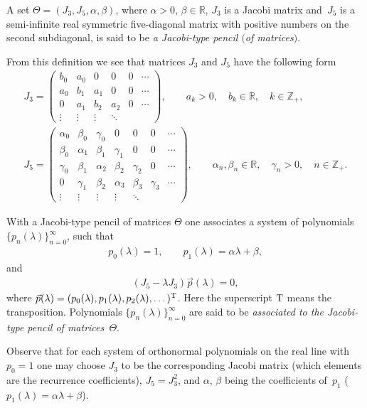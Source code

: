 \begin{Definition}\label{d1_1}A set $\Theta = (J_3, J_5, \alpha, \beta)$, where $\alpha>0$, $\beta\in\mathbb{R}$, $J_3$ is a Jacobi matrix and~$J_5$ is a semi-inf\/inite real symmetric f\/ive-diagonal matrix with positive numbers on the second subdiagonal, is said to be \textit{a Jacobi-type pencil $($of matrices$)$}.
\end{Definition}
From this def\/inition we see that matrices $J_3$ and $J_5$ have the following form
\begin{gather}
J_3 =
\left(
\begin{matrix}
b_0 & a_0 & 0 & 0 & 0 & \cdots\\
a_0 & b_1 & a_1 & 0 & 0 & \cdots\\
0 & a_1 & b_2 & a_2 & 0 &\cdots\\
\vdots & \vdots & \vdots & \ddots \end{matrix}
\right),\qquad a_k>0,\quad b_k\in\mathbb{R},\quad k\in\mathbb{Z}_+, \label{f1_5} \\
J_5 = \left(
\begin{matrix}
\alpha_0 & \beta_0 & \gamma_0 & 0 & 0 & 0 & \cdots\\
\beta_0 & \alpha_1 & \beta_1 & \gamma_1 & 0 & 0 & \cdots\\
\gamma_0 & \beta_1 & \alpha_2 & \beta_2 & \gamma_2 & 0 & \cdots\\
0 & \gamma_1 & \beta_2 & \alpha_3 & \beta_3 & \gamma_3 & \cdots \\
\vdots & \vdots & \vdots &\vdots & \ddots \end{matrix}
\right),\qquad \alpha_n,\beta_n\in\mathbb{R},\quad \gamma_n>0,\quad n\in\mathbb{Z}_+. \label{f1_10}
\end{gather}

With a Jacobi-type pencil of matrices $\Theta$ one associates a system of polynomials $\{ p_n(\lambda) \}_{n=0}^\infty$, such that
\begin{gather*} p_0(\lambda) = 1,\qquad p_1(\lambda) = \alpha\lambda + \beta, \end{gather*}
and
\begin{gather}\label{f1_20}
(J_5 - \lambda J_3) \vec p(\lambda) = 0,
\end{gather}
where $\vec p(\lambda) = (p_0(\lambda), p_1(\lambda), p_2(\lambda),\dots)^{\rm T}$. Here the superscript ${\rm T}$ means the transposition. Polynomials $\{ p_n(\lambda) \}_{n=0}^\infty$ are said to be \textit{associated to the Jacobi-type pencil of matrices~$\Theta$}.

Observe that for each system of orthonormal polynomials on the real line with $p_0=1$ one may choose $J_3$ to be the corresponding Jacobi matrix (which elements are the recurrence coef\/f\/icients), $J_5 = J_3^2$, and $\alpha$, $\beta$ being the coef\/f\/icients of~$p_1$ ($p_1(\lambda) = \alpha\lambda + \beta$).

